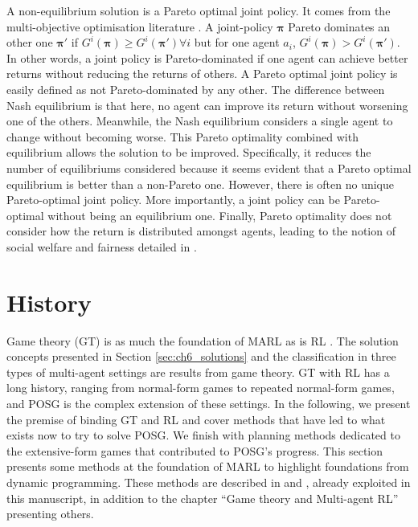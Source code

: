 A non-equilibrium solution is a Pareto optimal joint policy.
It comes from the multi-objective optimisation literature \citep{ehrgott2012vilfredo}.
A joint-policy $\mathbf{\pi}$ Pareto dominates an other one $\mathbf{\pi'}$ if $G^i(\mathbf{\pi}) \ge G^i(\mathbf{\pi'})\forall i$ but for one agent $a_i$, $G^i(\mathbf{\pi}) > G^i(\mathbf{\pi'})$.
In other words, a joint policy is Pareto-dominated if one agent can achieve better returns without reducing the returns of others.
A Pareto optimal joint policy is easily defined as not Pareto-dominated by any other.
The difference between Nash equilibrium is that here, no agent can improve its return without worsening one of the others.
Meanwhile, the Nash equilibrium considers a single agent to change without becoming worse.
This Pareto optimality combined with equilibrium allows the solution to be improved.
Specifically, it reduces the number of equilibriums considered because it seems evident that a Pareto optimal equilibrium is better than a non-Pareto one.
However, there is often no unique Pareto-optimal joint policy.
More importantly, a joint policy can be Pareto-optimal without being an equilibrium one.
Finally, Pareto optimality does not consider how the return is distributed amongst agents, leading to the notion of social welfare and fairness detailed in \citep{marl-book}.

\section{History}\label{sec:ch6_history}
Game theory (GT) \citep{von1947theory} is as much the foundation of MARL as is RL \citep{Nowe2012GTMARL, marl-book}.
The solution concepts presented in Section \ref{sec:ch6_solutions} and the classification in three types of multi-agent settings are results from game theory.
GT with RL has a long history, ranging from normal-form games to repeated normal-form games, and POSG is the complex extension of these settings.
In the following, we present the premise of binding GT and RL and cover methods that have led to what exists now to try to solve POSG.
We finish with planning methods dedicated to the extensive-form games that contributed to POSG's progress.
This section presents some methods at the foundation of MARL to highlight foundations from dynamic programming.
These methods are described in \citep{marl-book} and \citep{russel2010}, already exploited in this manuscript, in addition to the chapter ``Game theory and Multi-agent RL'' \citep{Nowe2012GTMARL} presenting others.

